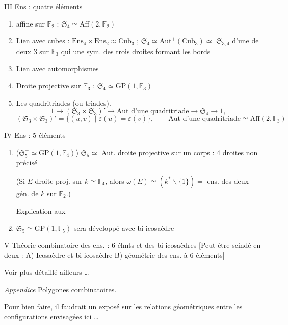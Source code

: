 \documentclass[11pt,a4paper]{article}
\begin{document}
III Ens : quatre éléments
\begin{enumerate}
  \item {}  affine sur $\mathbb{F}_2$ : $\mathfrak{S}_4 \simeq \mathrm{Aff}(2, \mathbb{F}_2)$
  \item Lien avec cubes : $\mathrm{Ens}_4 \times \mathrm{Ens}_2 \approx \mathrm{Cub}_3$ ; $\mathfrak{S}_4 \simeq \mathrm{Aut}^+(\mathrm{Cub}_3) \simeq$ \struck{\ill{}} $\mathfrak{S}_{3,4}$  d'une  de deux 3 sur $\mathbb{F}_3$ qui  une sym. des trois droites formant les bords \ill{}
  \item Lien avec  \ill{} automorphismes
  \item Droite projective sur $\mathbb{F}_3$ : $\mathfrak{S}_4 \simeq \mathrm{GP}(1, \mathbb{F}_3)$
  \item Les quadritriades (ou triades).
  \[
    1 \to (\mathfrak{S}_3 \times \mathfrak{S}_3)' \to \mathrm{Aut} \text{ d'une quadritriade} \to \mathfrak{S}_4 \to 1,
  \]
  \[
    (\mathfrak{S}_3 \times \mathfrak{S}_3)' = \{(u, v) \mid \varepsilon(u) = \varepsilon(v)\},
    \qquad \mathrm{Aut} \text{ d'une quadritriade} \simeq \mathrm{Aff}(2, \mathbb{F}_3)
  \]
\end{enumerate}

IV Ens : 5 éléments
\begin{enumerate}
  \item {} ($\mathfrak{S}_5^+ \simeq \mathrm{GP}(1, \mathbb{F}_4)$) \quad $\mathfrak{S}_5 \simeq$ Aut. droite projective sur un corps : 4 droites non précisé

  (Si $E$ droite proj. sur $k \simeq \mathbb{F}_4$, alors $\omega(E) \simeq (k^* \smallsetminus \{1\}) =$ ens. des deux gén. de $k$ sur $\mathbb{F}_2$.)

  Explication  aux 
  \item $\mathfrak{S}_5 \simeq \mathrm{GP}(1, \mathbb{F}_5)$ sera développé avec bi-icosaèdre
\end{enumerate}


V Théorie combinatoire des ens. : 6 élmts et des bi-icosaèdres [Peut être scindé en deux : A) Icosaèdre et bi-icosaèdre \quad B) géométrie des ens. à 6 éléments]

Voir plus détaillé ailleurs …

\struck{\ill{}}

\emph{Appendice} Polygones combinatoires.

Pour bien faire, il faudrait un exposé sur les relations géométriques entre les configurations envisagées ici …
\end{document}
